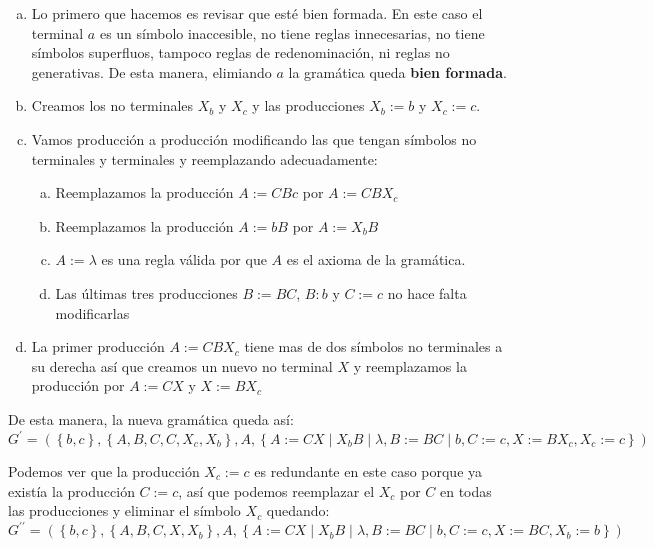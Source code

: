\documentclass[12pt]{article}
\begin{document}
\begin{enumerate}[a)]
  \item Lo primero que hacemos es revisar que esté bien formada. En este caso el terminal $ a $ es un símbolo inaccesible, no tiene reglas innecesarias, no tiene símbolos superfluos, tampoco reglas de redenominación, ni reglas no generativas. De esta manera, elimiando $ a $ la gramática queda \textbf{bien formada}.

  \item Creamos los no terminales $ X_{b} $ y $ X_{c} $ y las producciones $ X_{b}:=b $ y $ X_{c}:=c $.

  \item Vamos producción a producción modificando las que tengan símbolos no terminales y terminales y reemplazando adecuadamente:
	  \begin{enumerate}[a.]
	    \item Reemplazamos la producción $ A:=CBc $ por $ A:=CBX_{c} $

	    \item Reemplazamos la producción $ A:=bB $ por $ A:=X_{b}B $

	    \item $ A:=\lambda $ es una regla válida por que $ A $ es el axioma de la gramática.

	    \item Las últimas tres producciones $ B:=BC $, $ B:b $ y $ C:=c $ no hace falta modificarlas
	  \end{enumerate}

  \item La primer producción $ A:=CBX_{c} $ tiene mas de dos símbolos no terminales a su derecha así que creamos un nuevo no terminal $ X $ y reemplazamos la producción por $ A:=CX $ y $ X:=BX_{c} $
\end{enumerate}

De esta manera, la nueva gramática queda así:
\[
	G^{\prime} = \left(\left\{b,c\right\},\left\{A,B,C,C,X_{c},X_{b}\right\},A,\left\{A:=CX \mid X_{b}B \mid \lambda,B:=BC \mid b,C:=c,X:=BX_{c},X_{c}:=c\right\}\right)
\]

Podemos ver que la producción $ X_{c}:=c $ es redundante en este caso porque ya existía la producción $ C:=c $, así que podemos reemplazar el $ X_{c} $ por $ C $ en todas las producciones y eliminar el símbolo $ X_{c} $ quedando:
\[
G^{\prime\prime} = \left(\left\{b,c\right\},\left\{A,B,C,X,X_{b}\right\},A,\left\{A:=CX \mid X_{b}B \mid \lambda,B:=BC \mid b,C:=c,X:=BC,X_{b}:=b\right\}\right)
\]
\end{document}
